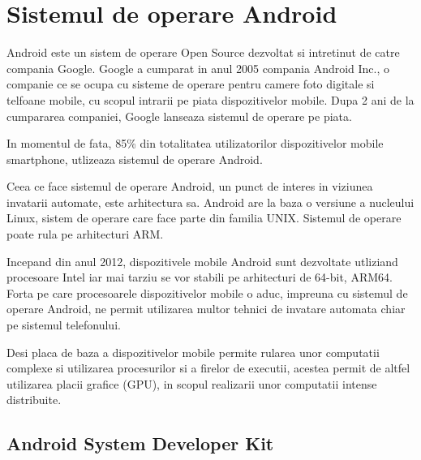 	\section{Sistemul de operare Android}
	
	Android este un sistem de operare Open Source dezvoltat si intretinut de catre compania Google. Google a cumparat in anul 2005 compania Android Inc., o companie ce se ocupa cu sisteme de operare pentru camere foto digitale si telfoane mobile, cu scopul intrarii pe piata dispozitivelor mobile. Dupa 2 ani de la cumpararea companiei, Google lanseaza sistemul de operare pe piata. 
	
	In momentul de fata, 85\% din totalitatea utilizatorilor dispozitivelor mobile smartphone, utlizeaza sistemul de operare Android. 
	
	Ceea ce face sistemul de operare Android, un punct de interes in viziunea invatarii automate, este arhitectura sa. Android are la baza o versiune a nucleului Linux, sistem de operare care face parte din familia UNIX. Sistemul de operare poate rula pe arhitecturi ARM. 
	
	Incepand din anul 2012, dispozitivele mobile Android sunt dezvoltate utliziand procesoare Intel iar mai tarziu se vor stabili pe arhitecturi de 64-bit, ARM64. 
	Forta pe care procesoarele dispozitivelor mobile o aduc, impreuna cu sistemul de operare Android, ne permit utilizarea multor tehnici de invatare automata chiar pe sistemul telefonului. 
	
	Desi placa de baza a dispozitivelor mobile permite rularea unor computatii complexe si utilizarea procesurilor si a firelor de executii, acestea permit de altfel utilizarea placii grafice (GPU), in scopul realizarii unor computatii intense distribuite.
	
	\subsection{Android System Developer Kit}
	
